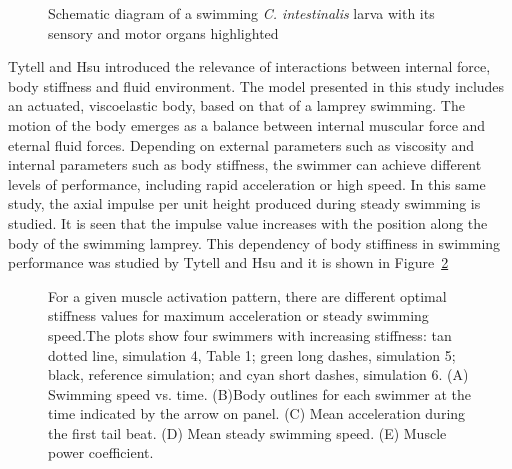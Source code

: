 \begin{figure}[H]
\centering
  \begin{footnotesize}
  
  \caption[Schematic diagram of a swimming \textit{C. intestinalis} larva with its sensory and motor organs highlighted]{Schematic diagram of a swimming \textit{C. intestinalis} larva with its sensory and motor organs highlighted}
  \label{fig:Bild3.7}
  \end{footnotesize}
\end{figure} 



Tytell and Hsu \cite{tytell_interactions_2010} introduced the relevance of interactions between internal force, body stiffness and fluid environment. The model presented in this
study includes an actuated, viscoelastic body, based on that of a lamprey swimming. The motion of the body emerges as a balance between internal muscular force and eternal fluid
forces. Depending on external parameters such as viscosity and internal parameters such as body stiffness, the swimmer can achieve different levels of performance, including
rapid acceleration or high speed. In this same study, the axial impulse per unit height produced during steady swimming is studied. It is seen that the impulse value increases with the position
along the body of the swimming lamprey. This dependency of body stiffiness in swimming performance was studied by Tytell and Hsu and it is shown in Figure~\ref{fig:Bild3.8}
\par


\begin{figure}[H]
\centering
  \begin{footnotesize}
  
  \caption[For a given muscle activation pattern, there are different optimal stiffness values for maximum acceleration or steady swimming speed.The plots show four swimmers 
  with increasing stiffness: tan dotted line, simulation 4, Table 1; green long dashes, simulation 5; black, reference simulation; and cyan short dashes, simulation 6. (A)
  Swimming speed vs. time. (B)Body outlines for each swimmer at the time indicated by the arrow on panel. (C) Mean acceleration during the first tail beat. (D) Mean steady
  swimming speed. (E) Muscle power coefficient]{For a given muscle activation pattern, there are different optimal stiffness values for maximum acceleration or steady swimming speed.The plots show four swimmers 
  with increasing stiffness: tan dotted line, simulation 4, Table 1; green long dashes, simulation 5; black, reference simulation; and cyan short dashes, simulation 6. (A)
  Swimming speed vs. time. (B)Body outlines for each swimmer at the time indicated by the arrow on panel. (C) Mean acceleration during the first tail beat. (D) Mean steady
  swimming speed. (E) Muscle power coefficient. \cite{tytell_interactions_2010}}
  \label{fig:Bild3.8}
  \end{footnotesize}
\end{figure} 






